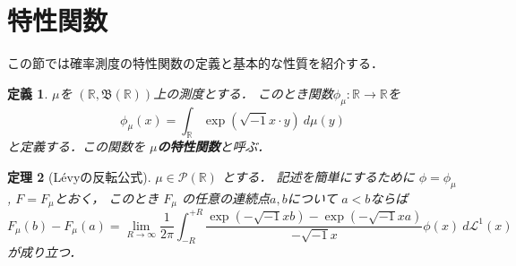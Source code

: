 \documentclass[leqno, 12pt]{jsarticle}
\newtheorem{thm}{定理}
\newtheorem{df}[thm]{定義}
\newcommand{\rr}{\mathbb{R}}
\begin{document}
\section{特性関数}
この節では確率測度の特性関数の定義と基本的な性質を紹介する．

\begin{df}
$\mu$を
$(\rr, \mathfrak{B}(\rr))$上の測度とする．
このとき関数$\phi_{\mu}: \rr\to \rr$を
\[
	\phi_{\mu}(x)
	=
	\int_{\rr}
	\exp(\sqrt{-1}x\cdot y)\ 
	d\mu (y)
\]
と定義する．この関数を
\textbf{$\mu$の特性関数}と呼ぶ．
\end{df}

\begin{thm}[L\'evyの反転公式]\label{thm:levy}
$\mu\in \mathcal{P}(\rr)$
とする．
記述を簡単にするために
$\phi=\phi_{\mu}$,
$F=F_{\mu}$とおく，
このとき
$F_{\mu}$
の任意の連続点$a, b$について
$a<b$ならば
\[
	F_{\mu}(b)-F_{\mu}(a)=
	\lim_{R\to \infty}
	\frac{1}{2\pi}\int_{-R}^{+R}
	\frac{\exp(-\sqrt{-1}xb)-\exp(-\sqrt{-1}xa)}{-\sqrt{-1}x}
	\phi(x)\ 
	d\mathcal{L}^1(x)
\]
が成り立つ．

\end{thm}
\end{document}
